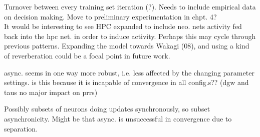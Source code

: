 Turnover between every training set iteration (?). Needs to include empirical data on decision making. Move to preliminary experimentation in chpt. 4?
\\

It would be interesting to see HPC expanded to include neo. nets activity fed back into the hpc net. in order to induce activity. Perhaps this may cycle through previous patterns. Expanding the model towards Wakagi (08), and using a kind of reverberation could be a focal point in future work.

async. seems in one way more robust, i.e. less affected by the changing parameter settings. is this because it is incapable of convergence in all config.s?? (dgw and taus no major impact on prrs)

Possibly subsets of neurons doing updates synchronously, so subset asynchronicity. Might be that async. is unsuccessful in convergence due to separation.


\cleardoublepage
